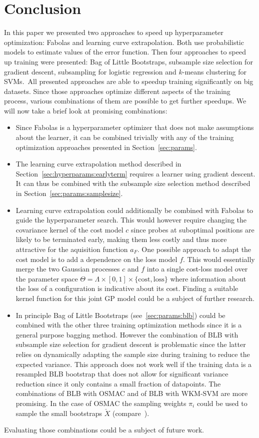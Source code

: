 \section{Conclusion}%
\label{sec:conclusion}

In this paper we presented two approaches to speed up hyperparameter optimization: Fabolas and learning curve extrapolation.
Both use probabilistic models to estimate values of the error function.
Then four approaches to speed up training were presented: Bag of Little Bootstraps, subsample size selection for gradient descent, subsampling for logistic regression and \(k\)-means clustering for SVMs.\
All presented approaches are able to speedup training significantly on big datasets.
Since those approaches optimize different aspects of the training process, various combinations of them are possible to get further speedups.
We will now take a brief look at promising combinations:
\begin{itemize}
	\item Since Fabolas is a hyperparameter optimizer that does not make assumptions about the learner, it can be combined trivially with any of the training optimization approaches presented in Section~\ref{sec:params}.
	\item The learning curve extrapolation method described in Section~\ref{sec:hyperparams:earlyterm} requires a learner using gradient descent.
		It can thus be combined with the subsample size selection method described in Section~\ref{sec:params:samplesize}.
	\item Learning curve extrapolation could additionally be combined with Fabolas to guide the hyperparameter search.
		This would however require changing the covariance kernel of the cost model \(c\) since probes at suboptimal positions are likely to be terminated early, making them less costly and thus more attractive for the aquisition function \(a_F\).
		One possible approach to adapt the cost model is to add a dependence on the loss model \(f\).
		This would essentially merge the two Gaussian processes \(c\) and \(f\) into a single cost-loss model over the parameter space \(\Theta = \Lambda \times [0, 1] \times \{\mathrm{cost}, \mathrm{loss}\}\) where information about the loss of a configuration is indicative about its cost.
		Finding a suitable kernel function for this joint GP model could be a subject of further research.
	\item In principle Bag of Little Bootstraps (see~\ref{sec:params:blb}) could be combined with the other three training optimization methods since it is a general purpose bagging method.
		However the combination of BLB with subsample size selection for gradient descent is problematic since the latter relies on dynamically adapting the sample size during training to reduce the expected variance.
		This approach does not work well if the training data is a resampled BLB bootstrap that does not allow for significant variance reduction since it only contains a small fraction of datapoints.
		The combinations of BLB with OSMAC and of BLB with WKM-SVM are more promising.
		In the case of OSMAC the sampling weights \(\pi_i\) could be used to sample the small bootstraps \(\check{X}\) (compare~\citet{Norazan2009}).
\end{itemize}
Evaluating those combinations could be a subject of future work.
